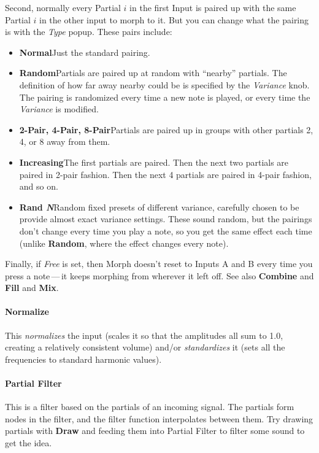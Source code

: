 \documentclass{article}
\begin{document}
Second, normally every Partial \(i\) in the first Input is paired up with the same Partial \(i\) in the other input to morph to it.  But you can change what the pairing is with the {\it Type} popup.  These pairs include:

\begin{itemize}
\item {\bf Normal}\qquad Just the standard pairing.
\item {\bf Random}\qquad Partials are paired up at random with ``nearby'' partials.  The definition of how far away nearby could be is specified by the {\it Variance} knob.  The pairing is randomized every time a new note is played, or every time the {\it Variance} is modified.
\item {\bf 2-Pair, 4-Pair, 8-Pair}\qquad Partials are paired up in groups with other partials 2, 4, or 8 away from them.
\item {\bf Increasing}\qquad The first partials are paired.  Then the next two partials are paired in 2-pair fashion.  Then the next 4 partials are paired in 4-pair fashion, and so on.
\item {\bf Rand \textit{N}}\qquad Random fixed presets of different variance, carefully chosen to be provide almost exact variance settings.  These sound random, but the pairings don't change every time you play a note, so you get the same effect each time (unlike {\bf Random}, where the effect changes every note).
\end{itemize}



Finally, if {\it Free} is set, then Morph doesn't reset to Inputs A and B every time you press a note\,---\,it keeps morphing from wherever it left off.  See also  {\bf Combine} and {\bf Fill} and {\bf Mix}.

\paragraph{Normalize} This {\it normalizes} the input (scales it so that the amplitudes all sum to 1.0, creating a relatively consistent volume) and/or {\it standardizes} it (sets all the frequencies to standard harmonic values).

\paragraph{Partial Filter} This is a filter based on the partials of an incoming signal.  The partials form nodes in the filter, and the filter function interpolates between them.  Try drawing partials with {\bf Draw} and feeding them into Partial Filter to filter some sound to get the idea.  
\end{document}
